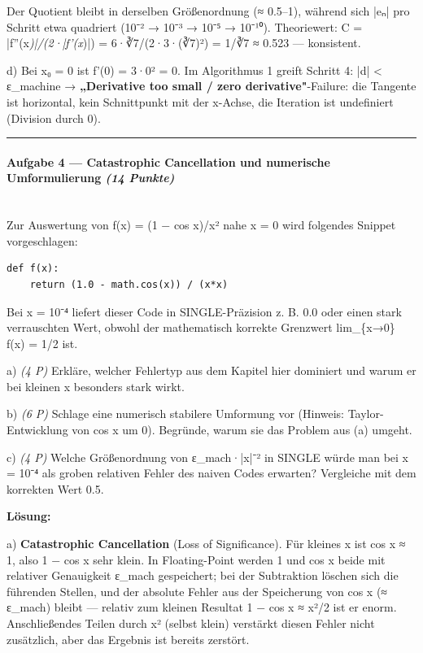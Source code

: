 \documentclass[11pt, a4paper]{article}
\begin{document}
Der Quotient bleibt in derselben Größenordnung (≈ 0.5–1), während sich |eₙ| pro Schritt etwa quadriert (10⁻² → 10⁻³ → 10⁻⁵ → 10⁻¹⁰). Theoriewert: C = |f''(x\textit{)|/(2·|f'(x})|) = 6·∛7/(2·3·(∛7)²) = 1/∛7 ≈ 0.523 — konsistent.


d) Bei x₀ = 0 ist f'(0) = 3·0² = 0. Im Algorithmus 1 greift Schritt 4: |d| < ε\_machine → \textbf{„Derivative too small / zero derivative"}-Failure: die Tangente ist horizontal, kein Schnittpunkt mit der x-Achse, die Iteration ist undefiniert (Division durch 0).



\noindent\textcolor{rulegray}{\rule{\linewidth}{0.4pt}}


\paragraph{Aufgabe 4 — Catastrophic Cancellation und numerische Umformulierung \textit{(14 Punkte)}}\mbox{}\\[2pt]

Zur Auswertung von f(x) = (1 − cos x)/x² nahe x = 0 wird folgendes Snippet vorgeschlagen:


\begin{lstlisting}
def f(x):
    return (1.0 - math.cos(x)) / (x*x)
\end{lstlisting}


Bei x = 10⁻⁴ liefert dieser Code in SINGLE-Präzision z. B. 0.0 oder einen stark verrauschten Wert, obwohl der mathematisch korrekte Grenzwert lim\_\{x→0\} f(x) = 1/2 ist.


a) \textit{(4 P)} Erkläre, welcher Fehlertyp aus dem Kapitel hier dominiert und warum er bei kleinen x besonders stark wirkt.


b) \textit{(6 P)} Schlage eine numerisch stabilere Umformung vor (Hinweis: Taylor-Entwicklung von cos x um 0). Begründe, warum sie das Problem aus (a) umgeht.


c) \textit{(4 P)} Welche Größenordnung von ε\_mach·|x|⁻² in SINGLE würde man bei x = 10⁻⁴ als groben relativen Fehler des naiven Codes erwarten? Vergleiche mit dem korrekten Wert 0.5.


\textbf{Lösung:}


a) \textbf{Catastrophic Cancellation} (Loss of Significance). Für kleines x ist cos x ≈ 1, also 1 − cos x sehr klein. In Floating-Point werden 1 und cos x beide mit relativer Genauigkeit ε\_mach gespeichert; bei der Subtraktion löschen sich die führenden Stellen, und der absolute Fehler aus der Speicherung von cos x (≈ ε\_mach) bleibt — relativ zum kleinen Resultat 1 − cos x ≈ x²/2 ist er enorm. Anschließendes Teilen durch x² (selbst klein) verstärkt diesen Fehler nicht zusätzlich, aber das Ergebnis ist bereits zerstört.
\end{document}
